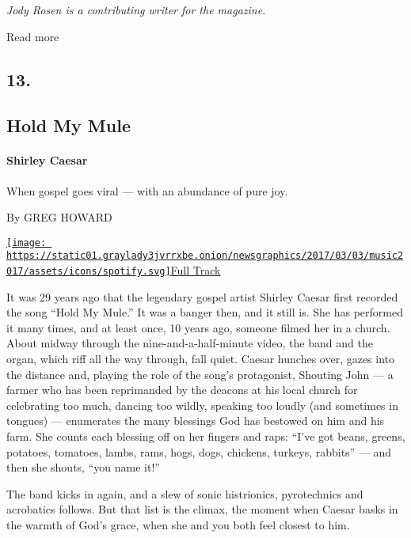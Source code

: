 \emph{Jody Rosen is a contributing writer for the magazine}.

Read more

\hypertarget{13}{%
\subsection{13.}\label{13}}

\hypertarget{--hold-my-mule}{%
\subsection{\texorpdfstring{ Hold My
Mule}{  Hold My Mule}}\label{--hold-my-mule}}

\hypertarget{shirley-caesar}{%
\paragraph{Shirley Caesar}\label{shirley-caesar}}

When gospel goes viral --- with an abundance of pure joy.

By GREG HOWARD

\href{https://open.spotify.com/track/0JjsI172ped2hF5v27o28J}{\texttt{[image: https://static01.graylady3jvrrxbe.onion/newsgraphics/2017/03/03/music2017/assets/icons/spotify.svg]}Full
Track}

It was 29 years ago that the legendary gospel artist Shirley Caesar
first recorded the song ``Hold My Mule.'' It was a banger then, and it
still is. She has performed it many times, and at least once, 10 years
ago, someone filmed her in a church. About midway through the
nine-and-a-half-minute video, the band and the organ, which riff all the
way through, fall quiet. Caesar hunches over, gazes into the distance
and, playing the role of the song's protagonist, Shouting John --- a
farmer who has been reprimanded by the deacons at his local church for
celebrating too much, dancing too wildly, speaking too loudly (and
sometimes in tongues) --- enumerates the many blessings God has bestowed
on him and his farm. She counts each blessing off on her fingers and
raps: ``I've got beans, greens, potatoes, tomatoes, lambs, rams, hogs,
dogs, chickens, turkeys, rabbits'' --- and then she shouts, ``you name
it!''

The band kicks in again, and a slew of sonic histrionics, pyrotechnics
and acrobatics follows. But that list is the climax, the moment when
Caesar basks in the warmth of God's grace, when she and you both feel
closest to him.

